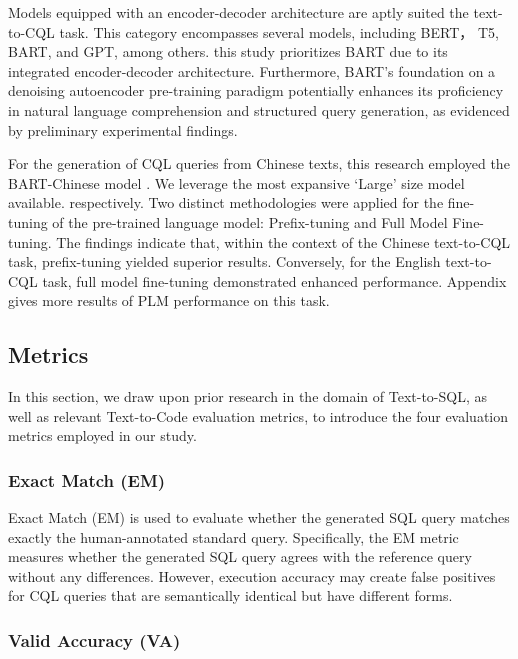 \documentclass[11pt]{article}
\begin{document}
\begin{CJK*}{UTF8}{gbsn}
Models equipped with an encoder-decoder architecture are aptly suited the text-to-CQL task. This category encompasses several models, including BERT\citep{devlin2018bert}， T5\citep{t5}, BART\citep{bart}, and  GPT\citep{radford2019gpt}, among others. this study prioritizes BART due to its integrated encoder-decoder architecture. Furthermore, BART's foundation on a denoising autoencoder pre-training paradigm potentially enhances its proficiency in natural language comprehension and structured query generation, as evidenced by preliminary experimental findings.

For the generation of CQL queries from Chinese texts, this research employed the BART-Chinese model \citep{shao2021bartlargechinese}. We leverage the most expansive `Large' size model available. respectively. Two distinct methodologies were applied for the fine-tuning of the pre-trained language model: Prefix-tuning and Full Model Fine-tuning. The findings indicate that, within the context of the Chinese text-to-CQL task, prefix-tuning yielded superior results. Conversely, for the English text-to-CQL task, full model fine-tuning demonstrated enhanced performance. 
Appendix gives more results of PLM performance on this task. %


\subsection{Metrics}

In this section, we draw upon prior research in the domain of Text-to-SQL, as well as relevant Text-to-Code evaluation metrics, to introduce the four evaluation metrics employed in our study.

\subsubsection{Exact Match (EM)}

Exact Match (EM) is used to evaluate whether the generated SQL query matches exactly the human-annotated standard query. Specifically, the EM metric measures whether the generated SQL query agrees with the reference query without any differences. 
However, execution accuracy may create false positives for CQL queries that are semantically identical but have different forms\citep{yu2018spider, deng-etal-2022-recent}.  

\subsubsection{Valid Accuracy (VA)}


\end{CJK*}
\end{document}

